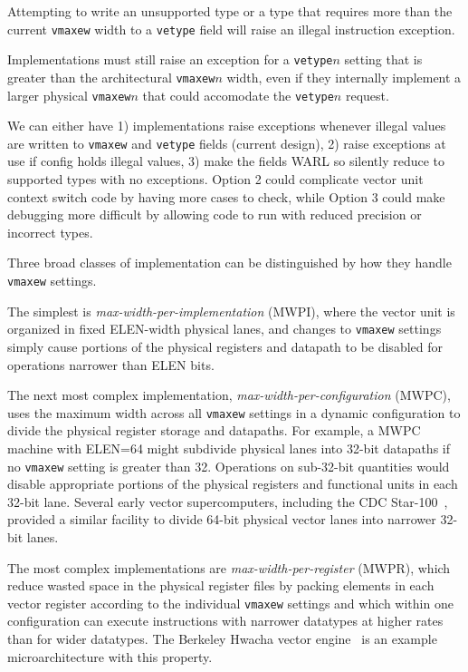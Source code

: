 Attempting to write an unsupported type or a type that requires more
than the current {\tt vmaxew} width to a {\tt vetype} field will raise
an illegal instruction exception.

\begin{commentary}
Implementations must still raise an exception for a {\tt vetype}$n$
setting that is greater than the architectural {\tt vmaxew}$n$ width,
even if they internally implement a larger physical {\tt vmaxew}$n$
that could accomodate the {\tt vetype}$n$ request.
\end{commentary}

\begin{discussion}
We can either have 1) implementations raise exceptions whenever
illegal values are written to {\tt vmaxew} and {\tt vetype} fields
(current design), 2) raise exceptions at use if config holds illegal
values, 3) make the fields WARL so silently reduce to supported types
with no exceptions.  Option 2 could complicate vector unit context
switch code by having more cases to check, while Option 3 could make
debugging more difficult by allowing code to run with reduced
precision or incorrect types.
\end{discussion}

\begin{commentary}
Three broad classes of implementation can be distinguished by how they
handle {\tt vmaxew} settings.

The simplest is {\em max-width-per-implementation} (MWPI), where the
vector unit is organized in fixed ELEN-width physical lanes, and
changes to {\tt vmaxew} settings simply cause portions of the
physical registers and datapath to be disabled for operations narrower
than ELEN bits.

The next most complex implementation, {\em
  max-width-per-configuration} (MWPC), uses the maximum width across
all {\tt vmaxew} settings in a dynamic configuration to divide the
physical register storage and datapaths.  For example, a MWPC machine
with ELEN=64 might subdivide physical lanes into 32-bit datapaths if
no {\tt vmaxew} setting is greater than 32.  Operations on
sub-32-bit quantities would disable appropriate portions of the
physical registers and functional units in each 32-bit lane.  Several
early vector supercomputers, including the CDC
Star-100~\cite{cdcstart100}, provided a similar facility to divide
64-bit physical vector lanes into narrower 32-bit lanes.

The most complex implementations are {\em max-width-per-register}
(MWPR), which reduce wasted space in the physical register files by
packing elements in each vector register according to the individual
{\tt vmaxew} settings and which within one configuration can
execute instructions with narrower datatypes at higher rates than for
wider datatypes.  The Berkeley Hwacha vector
engine~\cite{hwachatr,mixedprecision} is an example microarchitecture
with this property.
\end{commentary}

